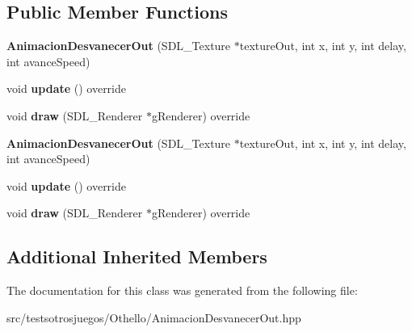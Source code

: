 \subsection*{Public Member Functions}
\begin{DoxyCompactItemize}
\item 
{\bfseries Animacion\+Desvanecer\+Out} (S\+D\+L\+\_\+\+Texture $\ast$texture\+Out, int x, int y, int delay, int avance\+Speed)\hypertarget{class_animacion_desvanecer_out_af5d8f08dc57fd0c0493b83584f812ce3}{}\label{class_animacion_desvanecer_out_af5d8f08dc57fd0c0493b83584f812ce3}

\item 
void {\bfseries update} () override\hypertarget{class_animacion_desvanecer_out_ab775719c268e5a45580497df5688437c}{}\label{class_animacion_desvanecer_out_ab775719c268e5a45580497df5688437c}

\item 
void {\bfseries draw} (S\+D\+L\+\_\+\+Renderer $\ast$g\+Renderer) override\hypertarget{class_animacion_desvanecer_out_a9a4c2f15d0b3a9d723e4ed5d198e429b}{}\label{class_animacion_desvanecer_out_a9a4c2f15d0b3a9d723e4ed5d198e429b}

\item 
{\bfseries Animacion\+Desvanecer\+Out} (S\+D\+L\+\_\+\+Texture $\ast$texture\+Out, int x, int y, int delay, int avance\+Speed)\hypertarget{class_animacion_desvanecer_out_af5d8f08dc57fd0c0493b83584f812ce3}{}\label{class_animacion_desvanecer_out_af5d8f08dc57fd0c0493b83584f812ce3}

\item 
void {\bfseries update} () override\hypertarget{class_animacion_desvanecer_out_ab775719c268e5a45580497df5688437c}{}\label{class_animacion_desvanecer_out_ab775719c268e5a45580497df5688437c}

\item 
void {\bfseries draw} (S\+D\+L\+\_\+\+Renderer $\ast$g\+Renderer) override\hypertarget{class_animacion_desvanecer_out_a9a4c2f15d0b3a9d723e4ed5d198e429b}{}\label{class_animacion_desvanecer_out_a9a4c2f15d0b3a9d723e4ed5d198e429b}

\end{DoxyCompactItemize}
\subsection*{Additional Inherited Members}


The documentation for this class was generated from the following file\+:\begin{DoxyCompactItemize}
\item 
src/testsotrosjuegos/\+Othello/Animacion\+Desvanecer\+Out.\+hpp\end{DoxyCompactItemize}
